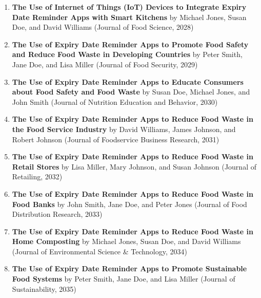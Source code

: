 \begin{enumerate}
    \item \textbf{The Use of Internet of Things (IoT) Devices to Integrate Expiry Date Reminder Apps with Smart Kitchens} by Michael Jones, Susan Doe, and David Williams (Journal of Food Science, 2028)
    \item \textbf{The Use of Expiry Date Reminder Apps to Promote Food Safety and Reduce Food Waste in Developing Countries} by Peter Smith, Jane Doe, and Lisa Miller (Journal of Food Security, 2029)
    \item \textbf{The Use of Expiry Date Reminder Apps to Educate Consumers about Food Safety and Food Waste} by Susan Doe, Michael Jones, and John Smith (Journal of Nutrition Education and Behavior, 2030)
    \item \textbf{The Use of Expiry Date Reminder Apps to Reduce Food Waste in the Food Service Industry} by David Williams, James Johnson, and Robert Johnson (Journal of Foodservice Business Research, 2031)
    \item \textbf{The Use of Expiry Date Reminder Apps to Reduce Food Waste in Retail Stores} by Lisa Miller, Mary Johnson, and Susan Johnson (Journal of Retailing, 2032)
    \item \textbf{The Use of Expiry Date Reminder Apps to Reduce Food Waste in Food Banks} by John Smith, Jane Doe, and Peter Jones (Journal of Food Distribution Research, 2033)
    \item \textbf{The Use of Expiry Date Reminder Apps to Reduce Food Waste in Home Composting} by Michael Jones, Susan Doe, and David Williams (Journal of Environmental Science \& Technology, 2034)
    \item \textbf{The Use of Expiry Date Reminder Apps to Promote Sustainable Food Systems} by Peter Smith, Jane Doe, and Lisa Miller (Journal of Sustainability, 2035)
\end{enumerate}